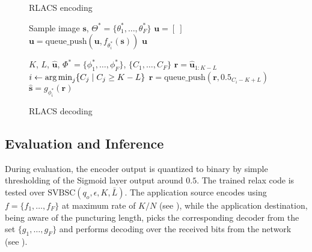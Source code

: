 \begin{figure*}[ht]%
    \centering
    \begin{minipage}[t]{0.45\linewidth}
        \begin{algorithm}[H]
        \caption{RLACS encoding}
        \label{alg:enc}
        \begin{algorithmic}[1]
        \REQUIRE Sample image $\mathbf{s}$, $\Theta^* = \{\theta^*_1, \ldots, \theta^*_F\}$
        \STATE $\mathbf{u} = [ \ ]$
            \STATE $\mathbf{u}=\text{queue\_push}(\mathbf{u},f_{\theta^*_i}(\mathbf{s}))$
        \ENDFOR
        \RETURN $\mathbf{u}$
        \end{algorithmic}
        \end{algorithm}
    \end{minipage}
    \hfill
    \begin{minipage}[t]{0.51\linewidth}
        \begin{algorithm}[H]
        \caption{RLACS decoding}
        \label{alg:dec}
        \begin{algorithmic}[1]
        \REQUIRE $K$, $L$, $\hat{\mathbf{u}}$, $\Phi^* = \{\phi^*_1, \ldots, \phi^*_F\}$,  $\{C_1, \ldots, C_F\}$
        \STATE $\mathbf{r}=\hat{\mathbf{u}}_{1:K-L}$  
        \STATE $i \gets \operatorname*{arg\,min}_{j} \{ C_j \mid C_j \geq K-L \} $
            \STATE $\mathbf{r}=\text{queue\_push}(\mathbf{r},\mathbf{0.5}_{C_i - K + L})$
        \ENDIF
        \RETURN $\hat{\mathbf{s}} = g_{\phi^*_i}({\mathbf{r}})$
        \end{algorithmic}
        \end{algorithm}
    \end{minipage}
\end{figure*}

\subsection{Evaluation and Inference}
During evaluation, the encoder output is quantized to binary by simple thresholding of the Sigmoid layer output around $0.5$.
The trained \gls{relax} code is tested over $\text{SVBSC}(q_o,\epsilon, K, \bar{L})$. The application source  encodes using $f = \{f_1,\ldots, f_F \}$  at maximum rate of $K/N$ (see ), while the application destination, being aware of the puncturing length, picks the corresponding decoder from the set $\{g_1,\ldots, g_F \}$ and performs decoding over the received bits from the network (see ).

